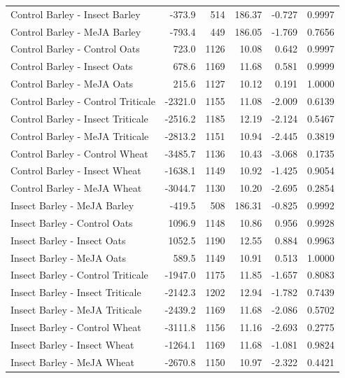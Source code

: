 \documentclass[12pt, letterpaper, ]{report}
\begin{document}
\begin{center}
\begin{longtable}{lrrrrr}
            Control Barley - Insect Barley & -373.9 & 514 & 186.37 & -0.727 & 0.9997 \\
            Control Barley - MeJA Barley & -793.4 & 449 & 186.05 & -1.769 & 0.7656 \\
            Control Barley - Control Oats & 723.0 &1126 & 10.08 & 0.642 & 0.9997 \\
            Control Barley - Insect Oats & 678.6 &1169 & 11.68 & 0.581 & 0.9999 \\
            Control Barley - MeJA Oats & 215.6 &1127 & 10.12 & 0.191 & 1.0000 \\
            Control Barley - Control Triticale &-2321.0 &1155 & 11.08 & -2.009 & 0.6139 \\
            Control Barley - Insect Triticale &-2516.2 &1185 & 12.19 & -2.124 & 0.5467 \\
            Control Barley - MeJA Triticale &-2813.2 &1151 & 10.94 & -2.445 & 0.3819 \\
            Control Barley - Control Wheat &-3485.7 &1136 & 10.43 & -3.068 & 0.1735 \\
            Control Barley - Insect Wheat &-1638.1 &1149 & 10.92 & -1.425 & 0.9054 \\
            Control Barley - MeJA Wheat &-3044.7 &1130 & 10.20 & -2.695 & 0.2854 \\
            Insect Barley - MeJA Barley & -419.5 & 508 & 186.31 & -0.825 & 0.9992 \\
            Insect Barley - Control Oats & 1096.9 &1148 & 10.86 & 0.956 & 0.9928 \\
            Insect Barley - Insect Oats & 1052.5 &1190 & 12.55 & 0.884 & 0.9963 \\
            Insect Barley - MeJA Oats & 589.5 &1149 & 10.91 & 0.513 & 1.0000 \\
            Insect Barley - Control Triticale &-1947.0 &1175 & 11.85 & -1.657 & 0.8083 \\
            Insect Barley - Insect Triticale &-2142.3 &1202 & 12.94 & -1.782 & 0.7439 \\
            Insect Barley - MeJA Triticale &-2439.2 &1169 & 11.68 & -2.086 & 0.5702 \\
            Insect Barley - Control Wheat &-3111.8 &1156 & 11.16 & -2.693 & 0.2775 \\
            Insect Barley - Insect Wheat &-1264.1 &1169 & 11.68 & -1.081 & 0.9824 \\
            Insect Barley - MeJA Wheat &-2670.8 &1150 & 10.97 & -2.322 & 0.4421 \\

\end{longtable}
\end{center}
\end{document}
